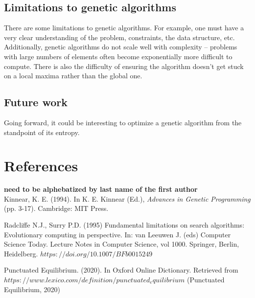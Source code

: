 \documentclass[11pt]{article}
\begin{document}
\subsection{Limitations to genetic algorithms}
\label{sec:org148bf83}
There are some limitations to genetic algorithms. For example, one must
have a very clear understanding of the problem, constraints, the data
structure, etc. Additionally, genetic algorithms do not scale well with
complexity -- problems with large numbers of elements often become exponentially
more difficult to compute. There is also the difficulty of ensuring the
algorithm doesn't get stuck on a local maxima rather than the global one.

\subsection{Future work}
\label{sec:org0f04af1}
Going forward, it could be interesting to optimize a genetic algorithm from the standpoint of its entropy.

\section{References}
\label{sec:org9dc046e}
\textbf{need to be alphebatized by last name of the first author}\\
\doublespacing
Kinnear, K. E. (1994). In K. E. Kinnear (Ed.), \emph{Advances in Genetic Programming} (pp. 3-17). Cambridge: MIT Press.

Radcliffe N.J., Surry P.D. (1995) Fundamental limitations on search algorithms: Evolutionary computing in perspective.
In: van Leeuwen J. (eds) Computer Science Today. Lecture Notes in Computer Science, vol 1000. Springer, Berlin, Heidelberg.
$https://doi.org/10.1007/BFb0015249$

Punctuated Equilibrium. (2020). In Oxford Online Dictionary. Retrieved from 
$https://www.lexico.com/definition/punctuated_equilibrium$
(Punctuated Equilibrium, 2020)
\end{document}
